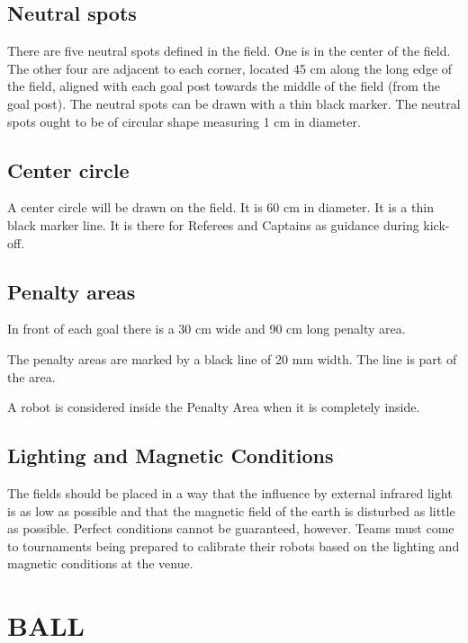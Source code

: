 \documentclass{article}
\begin{document}
\subsection{ Neutral spots \label{ref-034}}

There are five neutral spots defined in the field. One is in the center of the
field. The other four are adjacent to each corner, located 45 cm along the long
edge of the field, aligned with each goal post towards the middle of the field
(from the goal post). The neutral spots can be drawn with a thin black marker.
The neutral spots ought to be of circular shape measuring 1 cm in diameter.

\subsection{ Center circle \label{ref-035}}

A center circle will be drawn on the field. It is 60 cm in diameter. It is a
thin black marker line. It is there for Referees and Captains as guidance
during kick-off.

\subsection{ Penalty areas \label{ref-036}}

In front of each goal there is a 30 cm wide and 90 cm long penalty area.

The penalty areas are marked by a black line of 20 mm width. The line is part
of the area.

A robot is considered inside the Penalty Area when it is completely inside.

\subsection{Lighting and Magnetic Conditions \label{ref-037}}

The fields should be placed in a way that the influence by external infrared
light is as low as possible and that the magnetic field of the earth is
disturbed as little as possible. Perfect conditions cannot be guaranteed,
however. Teams must come to tournaments being prepared to calibrate their
robots based on the lighting and magnetic conditions at the venue.

\section{BALL \label{ref-038}}
\end{document}
